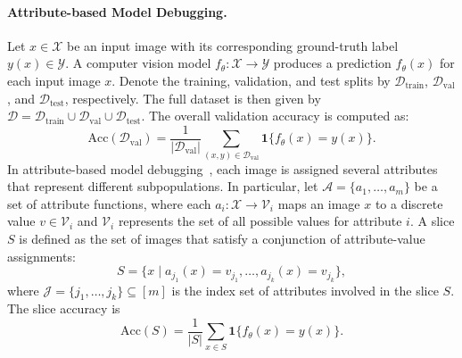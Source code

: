 \documentclass[10pt]{article} %
\begin{document}
\paragraph{Attribute-based Model Debugging.}  
Let \(x \in \mathcal{X}\) be an input image with its corresponding ground-truth label \(y(x) \in \mathcal{Y}\). A computer vision model \(f_\theta \colon \mathcal{X} \to \mathcal{Y}\) produces a prediction \(f_\theta(x)\) for each input image \(x\). Denote the training, validation, and test splits by \(\mathcal{D}_{\mathrm{train}}\), \(\mathcal{D}_{\mathrm{val}}\), and \(\mathcal{D}_{\mathrm{test}}\), respectively. The full dataset is then given by \(\mathcal{D} = \mathcal{D}_{\mathrm{train}} \cup \mathcal{D}_{\mathrm{val}} \cup \mathcal{D}_{\mathrm{test}}\). The overall validation accuracy is computed as: 
\begin{equation}
\mathrm{Acc}(\mathcal{D}_{\mathrm{val}})
=\frac{1}{|\mathcal{D}_{\mathrm{val}}|}
\sum_{(x, y) \in \mathcal{D}_{\mathrm{val}}}
\mathbf{1}\{f_\theta(x) = y(x)\}.
\end{equation}
In attribute-based model debugging~\citep{chen2023hibug}, each image is assigned several attributes that represent different subpopulations. 
In particular, let \(\mathcal{A} = \{a_1, \dots, a_m\}\) be a set of attribute functions, where each \(a_i \colon \mathcal{X} \to \mathcal{V}_i\) maps an image \(x\) to a discrete value \(v \in \mathcal{V}_i\) and $\mathcal{V}_i$ represents the set of all possible values for attribute $i$. A slice $S$ is defined as the set of images that satisfy a conjunction of attribute-value assignments: 
\begin{equation}
S = \{ x \mid a_{j_1}(x) = v_{j_1}, \dots, a_{j_k}(x) = v_{j_k}\},
\end{equation}
where \(\mathcal{J} = \{j_1, \dots, j_k\} \subseteq [m]\) is the index set of attributes involved in the slice \(S\).  
The slice accuracy is
\begin{equation}
\mathrm{Acc}(S) = \frac{1}{|S|}\sum_{x\in S}\mathbf{1}\{f_\theta(x) = y(x)\}.
\end{equation}

\end{document}
